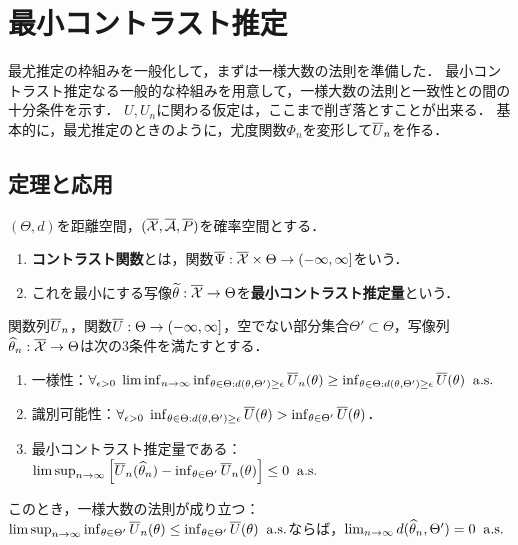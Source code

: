 \documentclass[uplatex,dvipdfmx]{jsreport}
\begin{document}
\section{最小コントラスト推定}

\begin{tcolorbox}[colframe=ForestGreen, colback=ForestGreen!10!white,breakable,colbacktitle=ForestGreen!40!white,coltitle=black,fonttitle=\bfseries\sffamily,
title=]
    最尤推定の枠組みを一般化して，まずは一様大数の法則を準備した．
    最小コントラスト推定なる一般的な枠組みを用意して，一様大数の法則と一致性との間の十分条件を示す．
    $U,U_n$に関わる仮定は，ここまで削ぎ落とすことが出来る．
    基本的に，最尤推定のときのように，尤度関数$\Phi_n$を変形して$\overline{U}_n$を作る．
\end{tcolorbox}

\subsection{定理と応用}

\begin{definition}
    $(\Theta,d)$を距離空間，$(\overline{\mathcal{X}},\overline{\mathcal{A}},\overline{P})$を確率空間とする．
    \begin{enumerate}
        \item \textbf{コントラスト関数}とは，関数$\overline{\Psi}:\overline{\mathcal{X}}\times\Theta\to(-\infty,\infty]$をいう．
        \item これを最小にする写像$\widetilde{\theta}:\overline{\mathcal{X}}\to\Theta$を\textbf{最小コントラスト推定量}という．
    \end{enumerate}
\end{definition}

\begin{theorem}[最小コントラスト推定量が強一致性を持つための十分条件]
    関数列$\overline{U}_n$，関数$\overline{U}:\Theta\to(-\infty,\infty]$，空でない部分集合$\Theta'\subset\Theta$，写像列$\widehat{\theta}_n:\overline{\mathcal{X}}\to\Theta$は次の3条件を満たすとする．
    \begin{enumerate}[({C}1)]
        \item 一様性：$\forall_{\epsilon>0}\;\liminf_{n\to\infty}\inf_{\theta\in\Theta:d(\theta,\Theta')\ge\epsilon}\overline{U}_n(\theta)\ge\inf_{\theta\in\Theta:d(\theta,\Theta')\ge\epsilon}\overline{U}(\theta)\;\;\mathrm{a.s.}$
        \item 識別可能性：$\forall_{\epsilon>0}\;\inf_{\theta\in\Theta:d(\theta,\Theta')\ge\epsilon}\overline{U}(\theta)>\inf_{\theta\in\Theta'}\overline{U}(\theta)$．
        \item 最小コントラスト推定量である：$\limsup_{n\to\infty}\left[\overline{U}_n(\widehat{\theta}_n)-\inf_{\theta\in\Theta'}\overline{U}_n(\theta)\right]\le0\;\;\mathrm{a.s.}$
    \end{enumerate}
    このとき，一様大数の法則が成り立つ：$\limsup_{n\to\infty}\inf_{\theta\in\Theta'}\overline{U}_n(\theta)\le\inf_{\theta\in\Theta'}\overline{U}(\theta)\;\;\mathrm{a.s.}$ならば，$\lim_{n\to\infty}d(\widehat{\theta}_n,\Theta')=0\;\;\mathrm{a.s.}$
\end{theorem}
\end{document}
